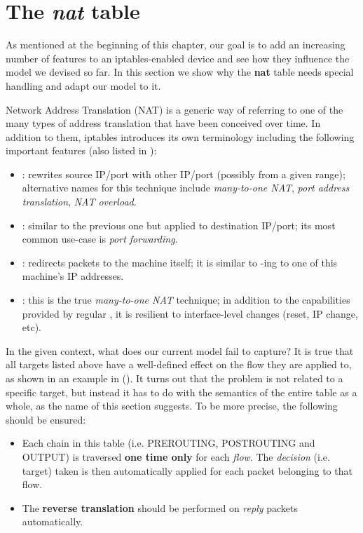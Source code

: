 \section{The \emph{nat} table}

As mentioned at the beginning of this chapter, our goal is to add an increasing
number of features to an iptables-enabled device and see how they influence the
model we devised so far.  In this section we show why the \textbf{nat} table
needs special handling and adapt our model to it.

Network Address Translation (NAT) is a generic way of referring to one of the
many types of address translation that have been conceived over time.  In
addition to them, iptables introduces its own terminology including the
following important features (also listed in
):
\begin{itemize}
  \item \SNAT : rewrites source IP/port with other IP/port (possibly from a
    given range); alternative names for this technique include
    \emph{many-to-one NAT}, \emph{port address translation}, \emph{NAT
    overload}.
  \item \DNAT : similar to the previous one but applied to destination IP/port;
    its most common use-case is \emph{port forwarding}.
  \item \REDIRECT : redirects packets to the machine itself; it is similar to
    \DNAT-ing to one of this machine's IP addresses.
  \item \MASQUERADE : this is the true \emph{many-to-one NAT} technique; in
    addition to the capabilities provided by regular \SNAT, it is resilient to
    interface-level changes (reset, IP change, etc).
\end{itemize}

In the given context, what does our current model fail to capture?  It is true
that all targets listed above have a well-defined effect on the flow they are
applied to, as shown in an example in
().  It turns out that the problem is
not related to a specific target, but instead it has to do with the semantics
of the entire table as a whole, as the name of this section suggests.  To be
more precise, the following should be ensured:
\begin{itemize}
  \item Each chain in this table (i.e. PREROUTING, POSTROUTING and OUTPUT) is
    traversed \textbf{one time only} for each \emph{flow}.  The \emph{decision}
    (i.e.  target) taken is then automatically applied for each packet
    belonging to that flow.
  \item The \textbf{reverse translation} should be performed on \emph{reply}
    packets automatically.
\end{itemize}

